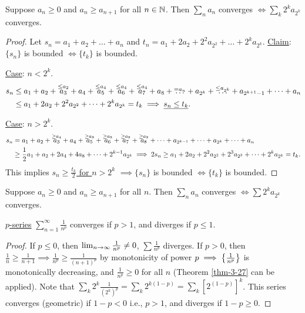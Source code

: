\documentclass[]{article}
\begin{document}
\begin{theorem}
	Suppose $a_n\geq 0$ and $a_n\geq a_{n+1}$ for all $n\in\mathbb{N}$.
	Then $\sum_n a_n$ converges $\iff\sum_k 2^ka_{2^k}$ converges.
	\label{thm-3-27}
\end{theorem}
\begin{proof}
	Let $s_n = a_1+a_2+\dots+a_n$ and $t_n = a_1 + 2a_2 + 2^2a_{2^2} + \dots + 2^ka_{2^k}$.
	\ul{Claim}: $\{s_n\}$ is bounded $\iff \{t_k\}$ is bounded.

	\ul{Case}: $n<2^k$.
	\begin{align*}
		s_n &\leq a_1 + a_2 + \overset{\leq a_2}{a_3} + a_4 + \overset{\leq a_4}{a_5} + \overset{\leq a_4}{a_6} + \overset{\leq a_4}{a_7} + a_8 + \overset{=a_n}{\dots} + a_{2^k} + \overset{\leq a_{2^k}}{\dots} + a_{2^{k+1}-1} + \dots + a_n \\
			&\leq a_1 + 2a_2 + 2^2a_{2^2} + \dots + 2^ka_{2^k} = t_k \implies \underline{s_n\leq t_k}.
	\end{align*}
	
	\ul{Case}: $n>2^k$.
	\begin{align*}
		s_n &= a_1 + a_2 + \overset{\geq a_4}{a_3} + a_4 + \overset{\geq a_8}{a_5} + \overset{\geq a_8}{a_6} + \overset{\geq a_8}{a_7} + \overset{\geq a_8}{a_8} + \dots + a_{2^{k-1}} + \dots + a_{2^k} + \dots + a_n \\
			&\geq \frac{1}{2}a_1 + a_2 + 2a_4 + 4a_8 + \dots + 2^{k-1}a_{2^k} \implies 2s_n \geq a_1 + 2a_2 + 2^2a_{2^2} + 2^3a_{2^3} + \dots + 2^ka_{2^k} = t_k.
	\end{align*}
	This implies \ul{$s_n\geq \frac{t_k}{2}$ for $n>2^k$} $\implies \{s_n\}$ is bounded $\iff\{t_k\}$ is bounded.
\end{proof}

\begin{recall}
	Suppose $a_n\geq 0$ and $a_n\geq a_{n+1}$ for all $n$.
	Then $\sum_n a_n$ converges $\iff \sum2^k a_{2^k}$ converges.
\end{recall}
\begin{theorem}
	\ul{$p$-series} $\sum_{n=1}^\infty\frac{1}{n^p}$ converges if $p>1$, and diverges if $p\leq 1$.
	\label{thm-3-28}
\end{theorem}
\begin{proof}
	If $p\leq 0$, then $\lim_{n\rightarrow\infty}\frac{1}{n^p}\neq 0$, $\sum \frac{1}{n^p}$ diverges.
	If $p>0$, then $\frac{1}{n}\geq\frac{1}{n+1} \implies \frac{1}{n^p}\geq\frac{1}{(n+1)^p}$ by monotonicity of power $p \implies \left\{ \frac{1}{n^p} \right\}$ is monotonically decreasing, and $\frac{1}{n^p}\geq 0$ for all $n$ (Theorem \ref{thm-3-27} can be applied).
	Note that $\sum_k 2^k\frac{1}{(2^k)^p} = \sum_k 2^{k(1-p)} = \sum_k [2^{(1-p)}]^k$.
	This series converges (geometric) if $1-p<0$ i.e., $p>1$, and diverges if $1-p\geq0$.
\end{proof}
\end{document}

